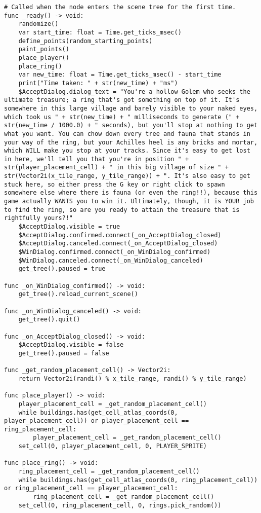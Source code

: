 \begin{lstlisting}
# Called when the node enters the scene tree for the first time.
func _ready() -> void:
	randomize()
	var start_time: float = Time.get_ticks_msec()
	define_points(random_starting_points)
	paint_points()
	place_player()
	place_ring()
	var new_time: float = Time.get_ticks_msec() - start_time
	print("Time taken: " + str(new_time) + "ms")
	$AcceptDialog.dialog_text = "You're a hollow Golem who seeks the ultimate treasure; a ring that's got something on top of it. It's somewhere in this large village and barely visible to your naked eyes, which took us " + str(new_time) + " milliseconds to generate (" + str(new_time / 1000.0) + " seconds), but you'll stop at nothing to get what you want. You can chow down every tree and fauna that stands in your way of the ring, but your Achilles heel is any bricks and mortar, which WILL make you stop at your tracks. Since it's easy to get lost in here, we'll tell you that you're in position " + str(player_placement_cell) + " in this big village of size " + str(Vector2i(x_tile_range, y_tile_range)) + ". It's also easy to get stuck here, so either press the G key or right click to spawn somewhere else where there is fauna (or even the ring!!), because this game actually WANTS you to win it. Ultimately, though, it is YOUR job to find the ring, so are you ready to attain the treasure that is rightfully yours?!"
	$AcceptDialog.visible = true
	$AcceptDialog.confirmed.connect(_on_AcceptDialog_closed)
	$AcceptDialog.canceled.connect(_on_AcceptDialog_closed)
	$WinDialog.confirmed.connect(_on_WinDialog_confirmed)
	$WinDialog.canceled.connect(_on_WinDialog_canceled)
	get_tree().paused = true

func _on_WinDialog_confirmed() -> void:
	get_tree().reload_current_scene()

func _on_WinDialog_canceled() -> void:
	get_tree().quit()

func _on_AcceptDialog_closed() -> void:
	$AcceptDialog.visible = false
	get_tree().paused = false

func _get_random_placement_cell() -> Vector2i:
	return Vector2i(randi() % x_tile_range, randi() % y_tile_range)

func place_player() -> void:
	player_placement_cell = _get_random_placement_cell()
	while buildings.has(get_cell_atlas_coords(0, player_placement_cell)) or player_placement_cell == ring_placement_cell:
		player_placement_cell = _get_random_placement_cell()
	set_cell(0, player_placement_cell, 0, PLAYER_SPRITE)

func place_ring() -> void:
	ring_placement_cell = _get_random_placement_cell()
	while buildings.has(get_cell_atlas_coords(0, ring_placement_cell)) or ring_placement_cell == player_placement_cell:
		ring_placement_cell = _get_random_placement_cell()
	set_cell(0, ring_placement_cell, 0, rings.pick_random())


\end{lstlisting}
